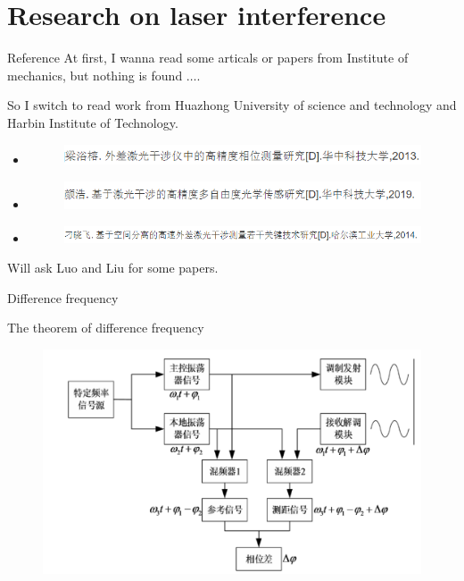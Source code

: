 \documentclass{beamer}
\begin{document}
\section{Research on laser interference}
\label{sec:research}

\begin{frame}[fragile]{Reference}
    At first, I wanna read some articals or papers from Institute of mechanics, but nothing is found $\dots$.
    
    So I switch to read work from Huazhong University of science and technology and Harbin Institute of Technology.
    
    \begin{itemize}
        \item 
\begin{figure}
    \centering
    \includegraphics[width=0.7\linewidth]{images/liangyurong}
\end{figure}
        \item
\begin{figure}
    \centering
    \includegraphics[width=0.7\linewidth]{images/yanhao}
\end{figure}
        \item
\begin{figure}
    \centering
    \includegraphics[width=0.7\linewidth]{images/diao}

\end{figure}

    \end{itemize}

Will ask Luo and Liu for some papers.
\end{frame}

\begin{frame}[fragile]{Difference frequency}
\begin{block}{The theorem of difference frequency}	
\begin{figure}
    \centering
    \includegraphics[width=0.7\linewidth]{images/chapin.png}
\end{figure}
\end{block}
\end{frame}
\end{document}
